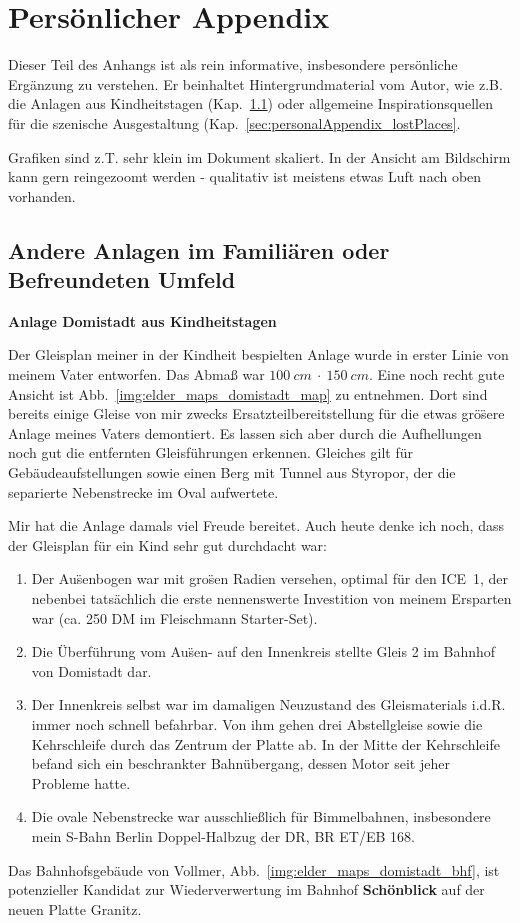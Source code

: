 \section{Pers\"onlicher Appendix}
\label{sec:personalAppendix}

Dieser Teil des Anhangs ist als rein informative, insbesondere pers\"onliche Erg\"anzung zu verstehen.
Er beinhaltet Hintergrundmaterial vom Autor, wie z.B. die Anlagen aus Kindheitstagen (Kap.~\ref{sec:personalAppendix_elderTracks}) oder allgemeine Inspirationsquellen f\"ur die szenische Ausgestaltung (Kap.~\ref{sec:personalAppendix_lostPlaces}.

Grafiken sind z.T. sehr klein im Dokument skaliert.
In der Ansicht am Bildschirm kann gern reingezoomt werden - qualitativ ist meistens etwas Luft nach oben vorhanden.


\subsection{Andere Anlagen im Famili\"aren oder Befreundeten Umfeld}
\label{sec:personalAppendix_elderTracks}

\textbf{Anlage Domistadt aus Kindheitstagen}

Der Gleisplan meiner in der Kindheit bespielten Anlage wurde in erster Linie von meinem Vater entworfen.
Das Abma{\ss} war $100~cm~\cdot~150~cm$.
Eine noch recht gute Ansicht ist Abb.~\ref{img:elder_maps_domistadt_map} zu entnehmen.
Dort sind bereits einige Gleise von mir zwecks Ersatzteilbereitstellung f\"ur die etwas gr\"o\"sere Anlage meines Vaters demontiert.
Es lassen sich aber durch die Aufhellungen noch gut die entfernten Gleisf\"uhrungen erkennen.
Gleiches gilt f\"ur Geb\"audeaufstellungen sowie einen Berg mit Tunnel aus Styropor, der die separierte Nebenstrecke im Oval aufwertete.

Mir hat die Anlage damals viel Freude bereitet.
Auch heute denke ich noch, dass der Gleisplan f\"ur ein Kind sehr gut durchdacht war:
\begin{enumerate}
	\item Der Au\"senbogen war mit gro\"sen Radien versehen, optimal f\"ur den ICE~1, der nebenbei tats\"achlich die erste nennenswerte Investition von meinem Ersparten war (ca. 250 DM im Fleischmann Starter-Set).
	\item Die \"Uberf\"uhrung vom Au\"sen- auf den Innenkreis stellte Gleis 2 im Bahnhof von Domistadt dar.
	\item Der Innenkreis selbst war im damaligen Neuzustand des Gleismaterials i.d.R. immer noch schnell befahrbar.
	Von ihm gehen drei Abstellgleise sowie die Kehrschleife durch das Zentrum der Platte ab.
	In der Mitte der Kehrschleife befand sich ein beschrankter Bahn\"ubergang, dessen Motor seit jeher Probleme hatte.
	\item Die ovale Nebenstrecke war ausschlie{\ss}lich f\"ur Bimmelbahnen, insbesondere mein S-Bahn Berlin Doppel-Halbzug der DR, BR ET/EB 168.
\end{enumerate}
Das Bahnhofsgeb\"aude von Vollmer, Abb.~\ref{img:elder_maps_domistadt_bhf}, ist potenzieller Kandidat zur Wiederverwertung im Bahnhof \textbf{Sch\"onblick} auf der neuen Platte Granitz.


